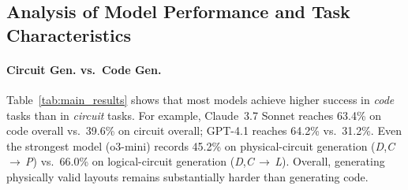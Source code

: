\documentclass{article} %
\begin{document}

\subsection{Analysis of Model Performance and Task Characteristics}

\paragraph{Circuit Gen. vs.\ Code Gen.}
Table~\ref{tab:main_results} shows that most models achieve higher success in \emph{code} tasks than in \emph{circuit} tasks. 
For example, Claude~3.7 Sonnet reaches 63.4\% on code overall vs.\ 39.6\% on circuit overall; GPT-4.1 reaches 64.2\% vs.\ 31.2\%. 
Even the strongest model (o3-mini) records 45.2\% on physical-circuit generation (\textit{D},\textit{C}\,$\rightarrow$\,\textit{P}) vs.\ 66.0\% on logical-circuit generation (\textit{D},\textit{C}\,$\rightarrow$\,\textit{L}). 
Overall, generating physically valid layouts remains substantially harder than generating code.
\end{document}
